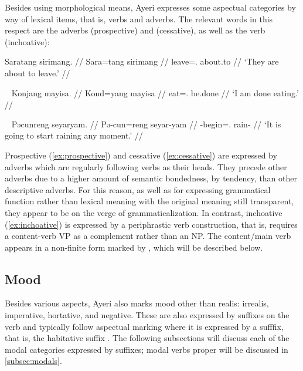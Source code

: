 Besides using morphological means, Ayeri expresses some aspectual categories by
way of lexical items, that is, verbs and adverbs. The relevant words in this
respect are the adverbs  (prospective) and
 (cessative), as well as 
the verb  (inchoative):

\ex\label{ex:prospective}\begingl
	\gla Saratang sirimang. //
	\glb Sara=tang sirimang //
	\glc leave=\TplM{}.\Aarg{} about.to //
	\glft `They are about to leave.' //
\endgl\xe

\ex~\label{ex:cessative}\begingl
	\gla Konjang mayisa. //
	\glb Kond=yang mayisa //
	\glc eat=\Fsg.\Aarg{} be.done //
	\glft `I am done eating.' //
\endgl\xe

\ex~\label{ex:inchoative}\begingl
	\gla Pəcunreng seyaryam. //
	\glb Pə-cun=reng seyar-yam //
	\glc \NFut{}-begin=\TsgI{}.\Aarg{} rain-\Ptcp{} //
	\glft `It is going to start raining any moment.' //
\endgl\xe

Prospective  (\ref{ex:prospective}) and cessative
 (\ref{ex:cessative}) are expressed by adverbs which are
regularly following verbs as their heads. They precede other adverbs due to a
higher amount of semantic bondedness, by tendency, than other descriptive
adverbs. For this reason, as well as for expressing grammatical function rather
than lexical meaning with the original meaning still transparent, they appear
to be on the verge of grammaticalization. In contrast, inchoative
 (\ref{ex:inchoative}) is expressed by a periphrastic verb 
construction, that is,  requires a content-verb VP as a 
complement rather than an NP. The content/main verb appears in a non-finite 
form marked by , which will be described below.

\subsection{Mood}
\label{subsec:mood}

Besides various aspects, Ayeri also marks mood other than realis: irrealis,
imperative, hortative, and negative. These are also expressed by suffixes on
the verb and typically follow aspectual marking where it is expressed by a
sufffix, that is, the habitative suffix . The following
subsections will discuss each of the modal categories expressed by suffixes;
modal verbs proper will be discussed in \autoref{subsec:modals}.

